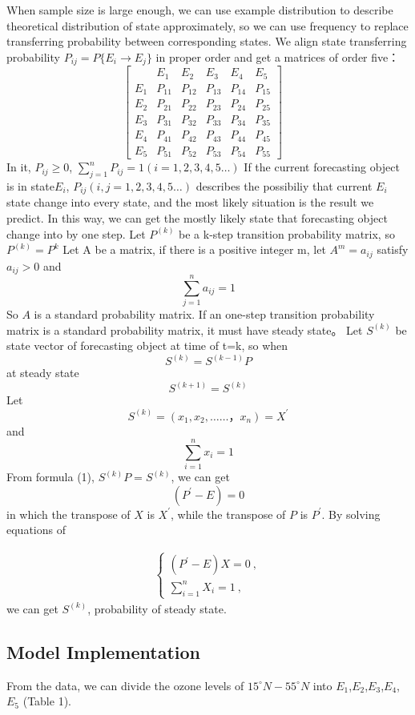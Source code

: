 \documentclass[12pt]{article}
\begin{document}
When sample size is large enough, we can use example distribution to describe  theoretical distribution of state approximately, so we can use frequency to replace transferring probability between corresponding states. 
We align state transferring probability $P_{ij}=P\{E_i\to E_j\}$ in proper order and get a matrices of order five：
$$
\begin{bmatrix} &E_1&E_2&E_3&E_4&E_5\\E_1&P_{11}&P_{12}&P_{13}&P_{14}&P_{15}\\E_2&P_{21}&P_{22}&P_{23}&P_{24}&P_{25}\\E_3&P_{31}&P_{32}&P_{33}&P_{34}&P_{35}\\E_4&P_{41}&P_{42}&P_{43}&P_{44}&P_{45}\\E_5&P_{51}&P_{52}&P_{53}&P_{54}&P_{55} \end{bmatrix} \quad
$$
In it, $P_{ij} \geq 0$, $\sum_{j=1}^{n}P_{ij}=1 (i=1,2,3,4,5 \ldots)$
    If the current forecasting object is in state$ E_i$, $P_{ij} (i,j=1,2,3,4,5\ldots)$ describes the possibiliy that current $ E_i$ state change into every state, and the most likely situation is the result we predict. In this way, we can get the mostly likely state that forecasting object change into by one step.
Let $P^{(k)}$ be a k-step transition probability matrix, so $P^{(k)}=P^k$
Let A be a matrix, if there is a positive integer m, let $A^m=a_{ij}$ satisfy $a_{ij}>0$ and $$\sum_{j=1}^{n}a_{ij}=1$$ 
So $A$ is a standard probability matrix.
If an one-step transition probability matrix is a standard probability matrix, it must have steady state。
Let $S^{(k)}$ be state vector of forecasting object at time of t=k, so when $$S^{(k)}=S^{(k-1)}P$$ at steady state $$S^{(k+1)}=S^{(k)}$$
Let $$S^{(k)}=(x_1,x_2,……，x_n)=X^{'}$$ and $$\sum_{i=1}^{n}x_{i}=1$$
From formula (1), $S^{(k)}P=S^{(k)}$, we can get $$(P^{'}-E)=0$$ in which the transpose of $X$ is $X^{'}$, while the transpose of $P$ is $P^{'}$.
By solving equations of

\begin{eqnarray}
\left\{
\begin{array}{ll}
(P^{'}-E)X=0 \  , \\
\sum_{i=1}^{n}X_{i}=1\ ,
\end{array}\right.\label{equ:dynamicofcollision}
\end{eqnarray}
we can get $S^{(k)}$, probability of steady state. 

\subsection{Model Implementation}
From the data, we can divide the ozone levels of $15^{\circ}N - 55^ {\circ}N$ into $E_1$,$E_2$,$E_3$,$E_4$,$E_5$ (Table 1).
\end{document}
